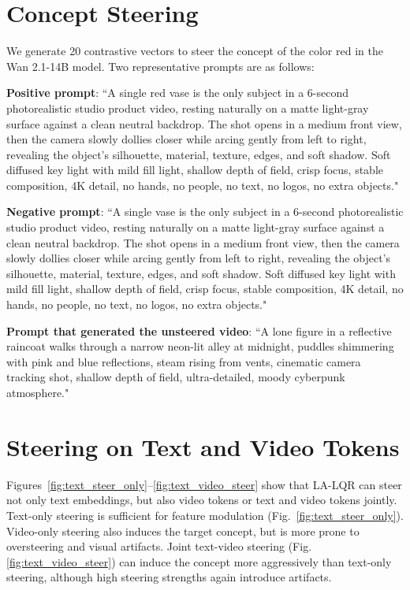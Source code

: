 \documentclass{article}
\begin{document}
\section{Concept Steering}\label{app:concept}

We generate 20 contrastive vectors to steer the concept of the color red in the Wan 2.1-14B \cite{wan2025wan} model. Two representative prompts are as follows:

\textbf{Positive prompt}: ``A single red vase is the only subject in a 6-second photorealistic studio product video, resting naturally on a matte light-gray surface against a clean neutral backdrop. The shot opens in a medium front view, then the camera slowly dollies closer while arcing gently from left to right, revealing the object's silhouette, material, texture, edges, and soft shadow. Soft diffused key light with mild fill light, shallow depth of field, crisp focus, stable composition, 4K detail, no hands, no people, no text, no logos, no extra objects."

\textbf{Negative prompt}: ``A single vase is the only subject in a 6-second photorealistic studio product video, resting naturally on a matte light-gray surface against a clean neutral backdrop. The shot opens in a medium front view, then the camera slowly dollies closer while arcing gently from left to right, revealing the object's silhouette, material, texture, edges, and soft shadow. Soft diffused key light with mild fill light, shallow depth of field, crisp focus, stable composition, 4K detail, no hands, no people, no text, no logos, no extra objects."

\textbf{Prompt that generated the unsteered video}: ``A lone figure in a reflective raincoat walks through a narrow neon-lit alley at midnight, puddles shimmering with pink and blue reflections, steam rising from vents, cinematic camera tracking shot, shallow depth of field, ultra-detailed, moody cyberpunk atmosphere."

\FloatBarrier
\section{Steering on Text and Video Tokens}\label{app:multi_steer}

Figures~\ref{fig:text_steer_only}--\ref{fig:text_video_steer} show that
LA-LQR can steer not only text embeddings, but also video tokens or text
and video tokens jointly. Text-only steering is sufficient for feature
modulation (Fig.~\ref{fig:text_steer_only}). Video-only steering also
induces the target concept, but is more prone to oversteering and visual
artifacts. Joint text-video steering (Fig. \ref{fig:text_video_steer}) can induce the concept more
aggressively than text-only steering, although high steering strengths
again introduce artifacts.
\end{document}
